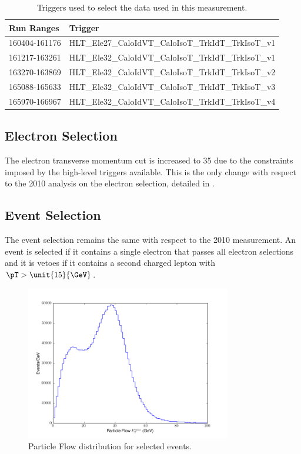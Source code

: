\begin{table}[htbp]
  \begin{center}
    \leavevmode
     \begin{tabular}{ll} 
\toprule
      Run Ranges & Trigger  \\
     \midrule
     160404-161176 & HLT\_Ele27\_CaloIdVT\_CaloIsoT\_TrkIdT\_TrkIsoT\_v1  \\
     161217-163261 & HLT\_Ele32\_CaloIdVT\_CaloIsoT\_TrkIdT\_TrkIsoT\_v1  \\
     163270-163869 & HLT\_Ele32\_CaloIdVT\_CaloIsoT\_TrkIdT\_TrkIsoT\_v2  \\
     165088-165633 & HLT\_Ele32\_CaloIdVT\_CaloIsoT\_TrkIdT\_TrkIsoT\_v3  \\
     165970-166967 & HLT\_Ele32\_CaloIdVT\_CaloIsoT\_TrkIdT\_TrkIsoT\_v4  \\
\bottomrule
     \end{tabular}
  \caption{Triggers used to select the data used in this measurement.}
  \label{tab:updatedtriggers}
   \end{center}
\end{table}

\subsection{Electron Selection}

The electron transverse momentum cut is increased to \unit{35}{\GeV} due to the
constraints imposed by the high-level triggers available.  This is the only
change with respect to the 2010 analysis on the electron selection, detailed in
.

\subsection{Event Selection}
The event selection remains the same with respect to the 2010 measurement.
An event is selected if it contains a single electron that passes all electron
selections and it is vetoes if it contains a second charged lepton with
$\pT>\unit{15}{\GeV}$.


\begin{figure}[htbp]
  \centering
  \includegraphics*[width=0.8\textwidth]{pfmet_update}
  \caption{Particle Flow \ETm distribution for selected events.}
  \label{fig:pfmet}
\end{figure}

